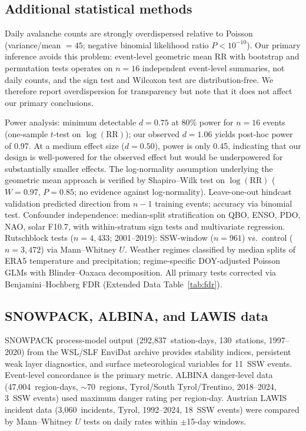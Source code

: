\documentclass[11pt,letterpaper]{article}
\begin{document}
\subsection*{Additional statistical methods}

Daily avalanche counts are strongly overdispersed relative to Poisson (variance/mean $= 45$; negative binomial likelihood ratio $P < 10^{-10}$). Our primary inference avoids this problem: event-level geometric mean RR with bootstrap and permutation tests operates on $n = 16$ independent event-level summaries, not daily counts, and the sign test and Wilcoxon test are distribution-free. We therefore report overdispersion for transparency but note that it does not affect our primary conclusions.

Power analysis: minimum detectable $d = 0.75$ at 80\% power for $n = 16$ events (one-sample $t$-test on $\log(\mathrm{RR})$); our observed $d = 1.06$ yields post-hoc power of 0.97. At a medium effect size ($d = 0.50$), power is only 0.45, indicating that our design is well-powered for the observed effect but would be underpowered for substantially smaller effects. The log-normality assumption underlying the geometric mean approach is verified by Shapiro--Wilk test on $\log(\mathrm{RR})$ ($W = 0.97$, $P = 0.85$; no evidence against log-normality). Leave-one-out hindcast validation predicted direction from $n - 1$ training events; accuracy via binomial test. Confounder independence: median-split stratification on QBO, ENSO, PDO, NAO, solar F10.7, with within-stratum sign tests and multivariate regression. Rutschblock tests ($n = 4{,}433$; 2001--2019): SSW-window ($n = 961$) vs.\ control ($n = 3{,}472$) via Mann--Whitney $U$. Weather regimes classified by median splits of ERA5 temperature and precipitation; regime-specific DOY-adjusted Poisson GLMs with Blinder--Oaxaca decomposition. All primary tests corrected via Benjamini--Hochberg FDR (Extended Data Table~\ref{tab:fdr}).

\subsection*{SNOWPACK, ALBINA, and LAWIS data}

SNOWPACK\cite{Bartelt2002,Lehning2002} process-model output (292,837~station-days, 130~stations, 1997--2020) from the WSL/SLF EnviDat archive provides stability indices, persistent weak layer diagnostics, and surface meteorological variables for 11~SSW events. Event-level concordance is the primary metric. ALBINA danger-level data (47,004~region-days, ${\sim}70$~regions, Tyrol/South Tyrol/Trentino, 2018--2024, 3~SSW events) used maximum danger rating per region-day. Austrian LAWIS incident data (3,060~incidents, Tyrol, 1992--2024, 18~SSW events) were compared by Mann--Whitney $U$ tests on daily rates within $\pm$15-day windows.
\end{document}
